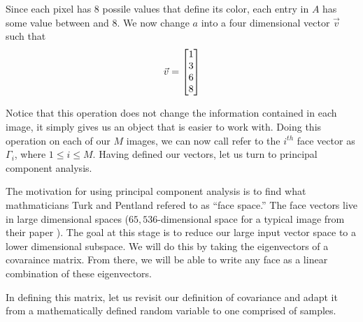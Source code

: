 \documentclass[12pt]{report}
\begin{document}

            Since each pixel has 8 possile values that define its color, each entry in $A$ has some value between and 8. We now change $a$ into a four dimensional vector $\vec{v}$ such that
                    \[
                        \vec{v} = \begin{bmatrix}
                            1 \\
                            3 \\
                            6 \\
                            8
                        \end{bmatrix}
                    \]

            Notice that this operation does not change the information contained in each image, it simply gives us an object that is easier to work with. Doing this operation on each of our $M$ images, we can now call refer to the $i^{th}$ face vector as $\Gamma_i$, where $1 \leq i \leq M$. Having defined our vectors, let us turn to principal component analysis.

            The motivation for using principal component analysis is to find what mathmaticians Turk and Pentland refered to as ``face space.'' The face vectors live in large dimensional spaces ($65,536$-dimensional space for a typical image from their paper \cite{Turk1991}). The goal at this stage is to reduce our large input vector space to a lower dimensional subspace. We will do this by taking the eigenvectors of a covaraince matrix. From there, we will be able to write any face as a linear combination of these eigenvectors.

            In defining this matrix, let us revisit our definition of covariance and adapt it from a mathematically defined random variable to one comprised of samples.

\end{document}
